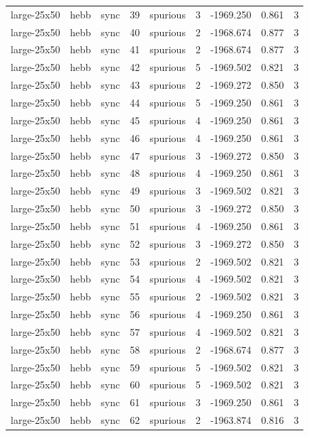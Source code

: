 \begin{tabular}{lllrlrrrr}
large-25x50 & hebb & sync & 39 & spurious & 3 & -1969.250 & 0.861 & 3 \\
large-25x50 & hebb & sync & 40 & spurious & 2 & -1968.674 & 0.877 & 3 \\
large-25x50 & hebb & sync & 41 & spurious & 2 & -1968.674 & 0.877 & 3 \\
large-25x50 & hebb & sync & 42 & spurious & 5 & -1969.502 & 0.821 & 3 \\
large-25x50 & hebb & sync & 43 & spurious & 2 & -1969.272 & 0.850 & 3 \\
large-25x50 & hebb & sync & 44 & spurious & 5 & -1969.250 & 0.861 & 3 \\
large-25x50 & hebb & sync & 45 & spurious & 4 & -1969.250 & 0.861 & 3 \\
large-25x50 & hebb & sync & 46 & spurious & 4 & -1969.250 & 0.861 & 3 \\
large-25x50 & hebb & sync & 47 & spurious & 3 & -1969.272 & 0.850 & 3 \\
large-25x50 & hebb & sync & 48 & spurious & 4 & -1969.250 & 0.861 & 3 \\
large-25x50 & hebb & sync & 49 & spurious & 3 & -1969.502 & 0.821 & 3 \\
large-25x50 & hebb & sync & 50 & spurious & 3 & -1969.272 & 0.850 & 3 \\
large-25x50 & hebb & sync & 51 & spurious & 4 & -1969.250 & 0.861 & 3 \\
large-25x50 & hebb & sync & 52 & spurious & 3 & -1969.272 & 0.850 & 3 \\
large-25x50 & hebb & sync & 53 & spurious & 2 & -1969.502 & 0.821 & 3 \\
large-25x50 & hebb & sync & 54 & spurious & 4 & -1969.502 & 0.821 & 3 \\
large-25x50 & hebb & sync & 55 & spurious & 2 & -1969.502 & 0.821 & 3 \\
large-25x50 & hebb & sync & 56 & spurious & 4 & -1969.250 & 0.861 & 3 \\
large-25x50 & hebb & sync & 57 & spurious & 4 & -1969.502 & 0.821 & 3 \\
large-25x50 & hebb & sync & 58 & spurious & 2 & -1968.674 & 0.877 & 3 \\
large-25x50 & hebb & sync & 59 & spurious & 5 & -1969.502 & 0.821 & 3 \\
large-25x50 & hebb & sync & 60 & spurious & 5 & -1969.502 & 0.821 & 3 \\
large-25x50 & hebb & sync & 61 & spurious & 3 & -1969.250 & 0.861 & 3 \\
large-25x50 & hebb & sync & 62 & spurious & 2 & -1963.874 & 0.816 & 3 \\

\end{tabular}
